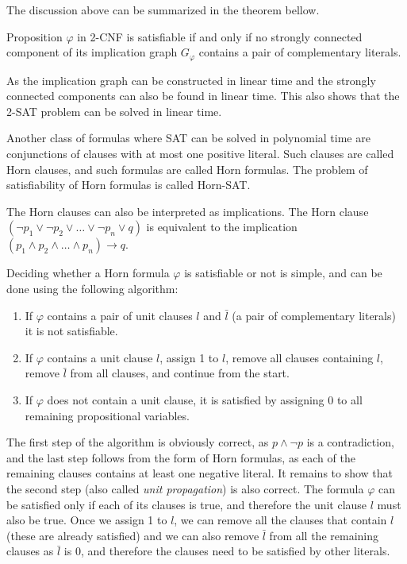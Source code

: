 The discussion above can be summarized in the theorem bellow.

\begin{theorem}
Proposition $\varphi$ in 2-CNF is satisfiable if and only if no strongly connected component of its implication graph $G_\varphi$ contains a pair of complementary literals.
\end{theorem}

As the implication graph can be constructed in linear time and the strongly connected components can also be found in linear time. This also shows that the 2-SAT problem can be solved in linear time.

Another class of formulas where SAT can be solved in polynomial time are conjunctions of clauses with at most one positive literal. Such clauses are called Horn clauses, and such formulas are called Horn formulas. The problem of satisfiability of Horn formulas is called Horn-SAT.

The Horn clauses can also be interpreted as implications. The Horn clause $(\neg p_1 \lor \neg p_2 \lor \dots \lor \neg p_n \lor q)$ is equivalent to the implication $(p_1 \land p_2 \land \dots \land p_n) \to q$.

Deciding whether a Horn formula $\varphi$ is satisfiable or not is simple, and can be done using the following algorithm:

\begin{enumerate}
  \item If $\varphi$ contains a pair of unit clauses $l$ and $\bar{l}$ (a pair of complementary literals) it is not satisfiable.
  \item If $\varphi$ contains a unit clause $l$, assign 1 to $l$, remove all clauses containing $l$, remove $\bar{l}$ from all clauses, and continue from the start.
  \item If $\varphi$ does not contain a unit clause, it is satisfied by assigning 0 to all remaining propositional variables.
\end{enumerate}

The first step of the algorithm is obviously correct, as $p \land \neg p$ is a contradiction, and the last step follows from the form of Horn formulas, as each of the remaining clauses contains at least one negative literal. It remains to show that the second step (also called \emph{unit propagation}) is also correct. The formula $\varphi$ can be satisfied only if each of its clauses is true, and therefore the unit clause $l$ must also be true. Once we assign 1 to $l$, we can remove all the clauses that contain $l$ (these are already satisfied) and we can also remove $\bar{l}$ from all the remaining clauses as $\bar{l}$ is 0, and therefore the clauses need to be satisfied by other literals.

